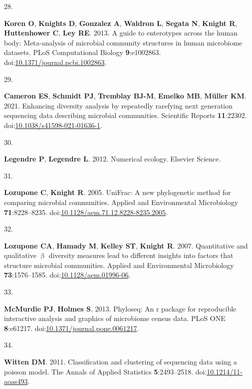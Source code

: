 \documentclass[
]{article}
\newlength{\cslhangindent}
\newlength{\csllabelwidth}
\newlength{\cslentryspacingunit} %
\newenvironment{CSLReferences}[2] %
 {%
  \setlength{\parindent}{0pt}
  \ifodd #1
  \let\oldpar\par
  \def\par{\hangindent=\cslhangindent\oldpar}
  \fi
  \setlength{\parskip}{#2\cslentryspacingunit}
 }%
 {}
\newcommand{\CSLLeftMargin}[1]{\parbox[t]{\csllabelwidth}{#1}}
\newcommand{\CSLRightInline}[1]{\parbox[t]{\linewidth - \csllabelwidth}{#1}\break}
\begin{document}
\begin{CSLReferences}{0}{1}
\leavevmode{}%
\CSLLeftMargin{28. }%
\CSLRightInline{\textbf{Koren O}, \textbf{Knights D}, \textbf{Gonzalez
A}, \textbf{Waldron L}, \textbf{Segata N}, \textbf{Knight R},
\textbf{Huttenhower C}, \textbf{Ley RE}. 2013. A guide to enterotypes
across the human body: Meta-analysis of microbial community structures
in human microbiome datasets. {PLoS} Computational Biology
\textbf{9}:e1002863.
doi:\href{https://doi.org/10.1371/journal.pcbi.1002863}{10.1371/journal.pcbi.1002863}.}

\leavevmode{}%
\CSLLeftMargin{29. }%
\CSLRightInline{\textbf{Cameron ES}, \textbf{Schmidt PJ},
\textbf{Tremblay BJ-M}, \textbf{Emelko MB}, \textbf{Müller KM}. 2021.
Enhancing diversity analysis by repeatedly rarefying next generation
sequencing data describing microbial communities. Scientific Reports
\textbf{11}:22302.
doi:\href{https://doi.org/10.1038/s41598-021-01636-1}{10.1038/s41598-021-01636-1}.}

\leavevmode{}%
\CSLLeftMargin{30. }%
\CSLRightInline{\textbf{Legendre P}, \textbf{Legendre L}. 2012.
Numerical ecology. Elsevier Science.}

\leavevmode{}%
\CSLLeftMargin{31. }%
\CSLRightInline{\textbf{Lozupone C}, \textbf{Knight R}. 2005. {UniFrac}:
A new phylogenetic method for comparing microbial communities. Applied
and Environmental Microbiology \textbf{71}:8228--8235.
doi:\href{https://doi.org/10.1128/aem.71.12.8228-8235.2005}{10.1128/aem.71.12.8228-8235.2005}.}

\leavevmode{}%
\CSLLeftMargin{32. }%
\CSLRightInline{\textbf{Lozupone CA}, \textbf{Hamady M}, \textbf{Kelley
ST}, \textbf{Knight R}. 2007. Quantitative and qualitative \(\upbeta\)
diversity measures lead to different insights into factors that
structure microbial communities. Applied and Environmental Microbiology
\textbf{73}:1576--1585.
doi:\href{https://doi.org/10.1128/aem.01996-06}{10.1128/aem.01996-06}.}

\leavevmode{}%
\CSLLeftMargin{33. }%
\CSLRightInline{\textbf{McMurdie PJ}, \textbf{Holmes S}. 2013. Phyloseq:
An r package for reproducible interactive analysis and graphics of
microbiome census data. {PLoS} {ONE} \textbf{8}:e61217.
doi:\href{https://doi.org/10.1371/journal.pone.0061217}{10.1371/journal.pone.0061217}.}

\leavevmode{}%
\CSLLeftMargin{34. }%
\CSLRightInline{\textbf{Witten DM}. 2011. Classification and clustering
of sequencing data using a poisson model. The Annals of Applied
Statistics \textbf{5}:2493--2518.
doi:\href{https://doi.org/10.1214/11-aoas493}{10.1214/11-aoas493}.}


\end{CSLReferences}
\end{document}
